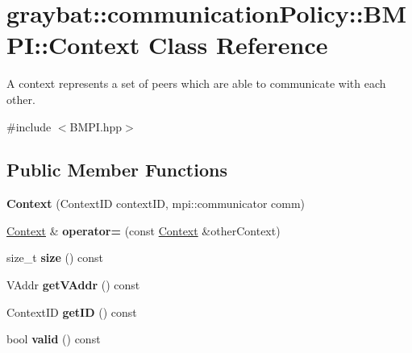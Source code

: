 \hypertarget{classgraybat_1_1communicationPolicy_1_1BMPI_1_1Context}{}\section{graybat\+:\+:communication\+Policy\+:\+:B\+M\+P\+I\+:\+:Context Class Reference}
\label{classgraybat_1_1communicationPolicy_1_1BMPI_1_1Context}


A context represents a set of peers which are able to communicate with each other.  




{\ttfamily \#include $<$B\+M\+P\+I.\+hpp$>$}

\subsection*{Public Member Functions}
\begin{DoxyCompactItemize}
\item 
\hypertarget{classgraybat_1_1communicationPolicy_1_1BMPI_1_1Context_ac43eada0cd66e74bff7aeb2a9cf83f86}{}{\bfseries Context} (Context\+I\+D context\+I\+D, mpi\+::communicator comm)\label{classgraybat_1_1communicationPolicy_1_1BMPI_1_1Context_ac43eada0cd66e74bff7aeb2a9cf83f86}

\item 
\hypertarget{classgraybat_1_1communicationPolicy_1_1BMPI_1_1Context_a96e88c5e9c858dd8c4f60064c2be96c8}{}\hyperlink{classgraybat_1_1communicationPolicy_1_1BMPI_1_1Context}{Context} \& {\bfseries operator=} (const \hyperlink{classgraybat_1_1communicationPolicy_1_1BMPI_1_1Context}{Context} \&other\+Context)\label{classgraybat_1_1communicationPolicy_1_1BMPI_1_1Context_a96e88c5e9c858dd8c4f60064c2be96c8}

\item 
\hypertarget{classgraybat_1_1communicationPolicy_1_1BMPI_1_1Context_ac6fea5ccd8f7aba9fc9ee0f4fea0d5ae}{}size\+\_\+t {\bfseries size} () const \label{classgraybat_1_1communicationPolicy_1_1BMPI_1_1Context_ac6fea5ccd8f7aba9fc9ee0f4fea0d5ae}

\item 
\hypertarget{classgraybat_1_1communicationPolicy_1_1BMPI_1_1Context_a39482f78e8eb400ee985acbb3030fdf3}{}V\+Addr {\bfseries get\+V\+Addr} () const \label{classgraybat_1_1communicationPolicy_1_1BMPI_1_1Context_a39482f78e8eb400ee985acbb3030fdf3}

\item 
\hypertarget{classgraybat_1_1communicationPolicy_1_1BMPI_1_1Context_a44a5d80b3d00743a785aaf6561b0b052}{}Context\+I\+D {\bfseries get\+I\+D} () const \label{classgraybat_1_1communicationPolicy_1_1BMPI_1_1Context_a44a5d80b3d00743a785aaf6561b0b052}

\item 
\hypertarget{classgraybat_1_1communicationPolicy_1_1BMPI_1_1Context_a4cb21e691f12a915ff2e4b4a63ab0064}{}bool {\bfseries valid} () const \label{classgraybat_1_1communicationPolicy_1_1BMPI_1_1Context_a4cb21e691f12a915ff2e4b4a63ab0064}

\end{DoxyCompactItemize}
